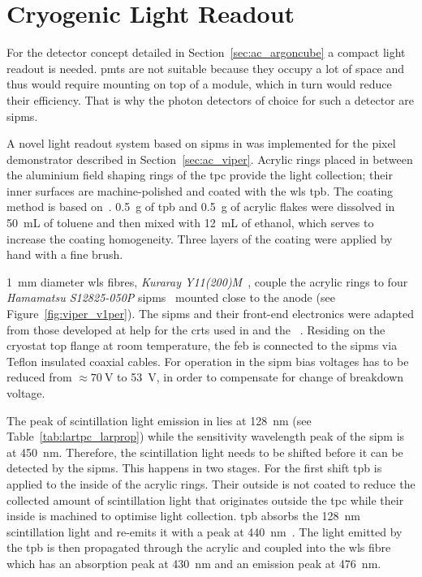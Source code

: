 \section{Cryogenic  Light Readout}
\label{sec:studies_viper-light-ro}


For the \AC{} detector concept detailed in Section~\ref{sec:ac_argoncube} a compact light readout is needed.
\glspl{pmt} are not suitable because they occupy a lot of space and thus would require mounting on top of a module, which in turn would reduce their efficiency.
That is why the photon detectors of choice for such a detector are \glspl{sipm}.

A novel light readout system based on \glspl{sipm} in \lar{} was implemented for the \AC{} pixel demonstrator described in Section~\ref{sec:ac_viper}.
Acrylic rings placed in between the aluminium field shaping rings of the \gls{tpc} provide the light collection; their inner surfaces are machine-polished and coated with the \gls{wls} \gls{tpb}. 
The coating method is based on~\cite{TPBcoating}.
\SI{0.5}{\gram} of \gls{tpb} and \SI{0.5}{\gram} of acrylic flakes were dissolved in \SI{50}{\milli\liter} of toluene and then mixed with \SI{12}{\milli\liter} of ethanol, which serves to increase the coating homogeneity. 
Three layers of the coating were applied by hand with a fine brush. 

\SI{1}{\milli\metre} diameter \gls{wls} fibres, \emph{Kuraray Y11(200)M}~\cite{kuraray}, couple the acrylic rings to four \emph{Hamamatsu S12825-050P} \glspl{sipm}~\cite{crt_sipm} mounted close to the anode (see Figure~\ref{fig:viper_v1per}). 
The \glspl{sipm} and their front-end electronics were adapted from those developed at \gls{help} for the \glspl{crt} used in \uboone{} and the \sbnd{}~\cite{crt, crt_feb}.
Residing on the cryostat top flange at room temperature, the \gls{feb} is connected to the \glspl{sipm} via Teflon insulated coaxial cables.
For operation in \lar{} the \gls{sipm} bias voltages has to be reduced from $\approx \SI{70}{\volt}$ to \SI{53}{\volt}, in order to compensate for change of breakdown voltage.

The peak of scintillation light emission in \lar{} lies at \SI{128}{\nano\metre} (see Table~\ref{tab:lartpc_larprop}) while the sensitivity wavelength peak of the \gls{sipm} is at \SI{450}{\nano\metre}.
Therefore, the scintillation light needs to be shifted before it can be detected by the \glspl{sipm}.
This happens in two stages.
For the first shift \gls{tpb} is applied to the inside of the acrylic rings.
Their outside is not coated to reduce the collected amount of scintillation light that originates outside the \gls{tpc} while their inside is machined to optimise light collection.
\gls{tpb} absorbs the \SI{128}{\nano\metre} scintillation light and re-emits it with a peak at \SI{440}{\nano\metre}~\cite{tpb}.
The light emitted by the \gls{tpb} is then propagated through the acrylic and coupled into the \gls{wls} fibre which has an absorption peak at \SI{430}{\nano\metre} and an emission peak at \SI{476}{\nano\metre}.

